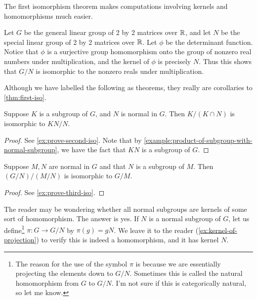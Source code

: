 \documentclass[./main.tex]{subfiles}
\begin{document}
The first isomorphism theorem makes computations involving kernels and
homomorphisms much easier.

\begin{example}
    Let $G$ be the general linear group of 2 by 2 matrices over $\mathbb{R}$, and let
    $N$ be the special linear group of 2 by 2 matrices over $\mathbb{R}$. Let $\phi$ be
    the determinant function. Notice that $\phi$ is a surjective group
    homomorphism onto the group of nonzero real numbers under multiplication,
    and the kernel of $\phi$ is precisely $N$. Thus this shows that $G/N$ is
    isomorphic to the nonzero reals under multiplication.
\end{example}





Although we have labelled the following as theorems, they really are corollaries
to \cref{thm:first-iso}.

\begin{theorem}
\label{thm:second-iso}
    Suppose $K$ is a subgroup of $G$, and $N$ is normal in $G$. Then $K/(K \cap
    N)$ is isomorphic to $KN/N$.
\end{theorem}
\begin{proof}
    See \cref{ex:prove-second-iso}. Note that by
    \cref{example:product-of-subgroup-with-normal-subgroup}, we have the fact that $KN$ is a
    subgroup of $G$.
\end{proof}

\begin{theorem}
\label{thm:third-iso}
    Suppose $M, N$ are normal in $G$ and that $N$ is a subgroup of $M$. Then
    $(G/N) / (M/N)$ is isomorphic to $G/M$. 
\end{theorem}
\begin{proof}
    See \cref{ex:prove-third-iso}.
\end{proof}


The reader may be wondering whether all normal subgroups are kernels of some
sort of homomorphism. The answer is yes. If $N$ is a normal subgroup of $G$, let
us define\footnote{The reason for the use of the symbol $\pi$ is because we are
essentially projecting the elements down to $G/N$. Sometimes this is called the
natural homomorphism from $G$ to $G/N$. I'm not sure if this is categorically
natural, so let me know.} $\pi: G \to G/N$ by $\pi(g) = gN$. We leave it to the
reader (\cref{ex:kernel-of-projection}) to verify this is indeed a homomorphism,
and it has kernel $N$.
\end{document}

